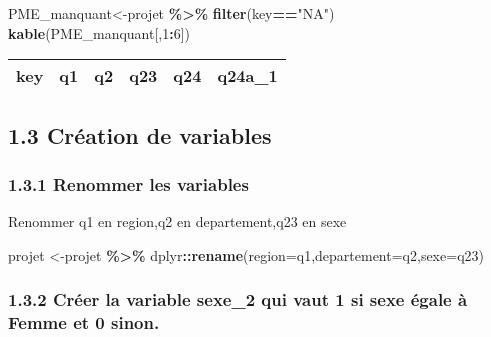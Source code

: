 \documentclass[
]{article}
\newenvironment{Shaded}{\begin{snugshade}}{\end{snugshade}}
\newcommand{\AttributeTok}[1]{\textcolor[rgb]{0.13,0.29,0.53}{#1}}
\newcommand{\DecValTok}[1]{\textcolor[rgb]{0.00,0.00,0.81}{#1}}
\newcommand{\FunctionTok}[1]{\textcolor[rgb]{0.13,0.29,0.53}{\textbf{#1}}}
\newcommand{\NormalTok}[1]{#1}
\newcommand{\OtherTok}[1]{\textcolor[rgb]{0.56,0.35,0.01}{#1}}
\newcommand{\SpecialCharTok}[1]{\textcolor[rgb]{0.81,0.36,0.00}{\textbf{#1}}}
\newcommand{\StringTok}[1]{\textcolor[rgb]{0.31,0.60,0.02}{#1}}
\begin{document}
\begin{Shaded}
\begin{Highlighting}[]
\NormalTok{PME\_manquant}\OtherTok{\textless{}{-}}\NormalTok{projet }\SpecialCharTok{\%\textgreater{}\%} \FunctionTok{filter}\NormalTok{(key}\SpecialCharTok{==}\StringTok{"NA"}\NormalTok{)}
\FunctionTok{kable}\NormalTok{(PME\_manquant[,}\DecValTok{1}\SpecialCharTok{:}\DecValTok{6}\NormalTok{])}
\end{Highlighting}
\end{Shaded}

\begin{tabular}{l|l|l|l|r|r}
\hline
key & q1 & q2 & q23 & q24 & q24a\_1\\


\hline
\end{tabular}

\hypertarget{cruxe9ation-de-variables}{%
\subsection{1.3 Création de variables}\label{cruxe9ation-de-variables}}

\hypertarget{renommer-les-variables}{%
\subsubsection{1.3.1 Renommer les
variables}\label{renommer-les-variables}}

Renommer q1 en region,q2 en departement,q23 en sexe

\begin{Shaded}
\begin{Highlighting}[]
\NormalTok{projet }\OtherTok{\textless{}{-}}\NormalTok{projet }\SpecialCharTok{\%\textgreater{}\%}\NormalTok{ dplyr}\SpecialCharTok{::}\FunctionTok{rename}\NormalTok{(}\AttributeTok{region=}\NormalTok{q1,}\AttributeTok{departement=}\NormalTok{q2,}\AttributeTok{sexe=}\NormalTok{q23)}
\end{Highlighting}
\end{Shaded}

\hypertarget{cruxe9er-la-variable-sexe_2-qui-vaut-1-si-sexe-uxe9gale-uxe0-femme-et-0-sinon.}{%
\subsubsection{1.3.2 Créer la variable sexe\_2 qui vaut 1 si sexe égale
à Femme et 0
sinon.}\label{cruxe9er-la-variable-sexe_2-qui-vaut-1-si-sexe-uxe9gale-uxe0-femme-et-0-sinon.}}
\end{document}
